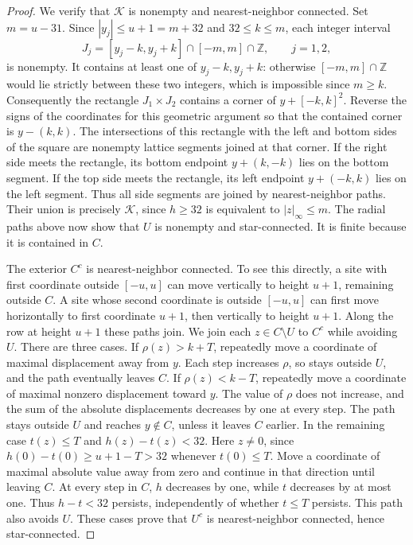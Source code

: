 \begin{proof}
We verify that \(\mathcal K\) is nonempty and nearest-neighbor
connected.  Set \(m=u-31\).  Since \(|y_j|\le u+1=m+32\)
and \(32\le k\le m\), each integer interval
\[
 J_j=[y_j-k,y_j+k]\cap[-m,m]\cap\mathbb Z,
       \qquad j=1,2,
\]
is nonempty.  It contains at least one of \(y_j-k,y_j+k\):
otherwise \([-m,m]\cap\mathbb Z\) would lie strictly between
these two integers, which is impossible since \(m\ge k\).
Consequently the rectangle \(J_1\times J_2\) contains a corner
of \(y+[-k,k]^2\).  Reverse the signs of the coordinates for
this geometric argument so that the contained corner is
\(y-(k,k)\).  The intersections of this rectangle with the left
and bottom sides of the square are nonempty lattice segments
joined at that corner.  If the right side meets the rectangle,
its bottom endpoint \(y+(k,-k)\) lies on the bottom segment.
If the top side meets the rectangle, its left endpoint
\(y+(-k,k)\) lies on the left segment.  Thus all side segments
are joined by nearest-neighbor paths.  Their union is precisely
\(\mathcal K\), since \(h\ge32\) is equivalent to
\(|z|_\infty\le m\).  The radial paths above now show that
\(U\) is nonempty and star-connected.  It is finite because
it is contained in \(C\).

The exterior \(C^c\) is nearest-neighbor connected.  To see this
directly, a site with first coordinate outside \([-u,u]\) can
move vertically to height \(u+1\), remaining outside \(C\).
A site whose second coordinate is outside \([-u,u]\) can first
move horizontally to first coordinate \(u+1\), then vertically
to height \(u+1\).  Along the row at height \(u+1\) these paths
join.  We join each \(z\in C\setminus U\) to \(C^c\) while
avoiding \(U\).  There are three cases.
If \(\rho(z)>k+T\), repeatedly move a coordinate of maximal
displacement away from \(y\).  Each step increases \(\rho\),
so stays outside \(U\), and the path eventually leaves \(C\).
If \(\rho(z)<k-T\), repeatedly move a coordinate of maximal
nonzero displacement toward \(y\).  The value of \(\rho\)
does not increase, and the sum of the absolute displacements
decreases by one at every step.  The path stays outside \(U\)
and reaches \(y\notin C\), unless it leaves \(C\) earlier.
In the remaining case \(t(z)\le T\) and \(h(z)-t(z)<32\).
Here \(z\ne0\), since \(h(0)-t(0)\ge u+1-T>32\) whenever
\(t(0)\le T\).  Move a coordinate of maximal absolute value
away from zero and continue in that direction until leaving
\(C\).  At every step in \(C\), \(h\) decreases by one,
while \(t\) decreases by at most one.  Thus \(h-t<32\)
persists, independently of whether \(t\le T\) persists.
This path also avoids \(U\).  These cases prove that \(U^c\)
is nearest-neighbor connected, hence star-connected.


\end{proof}
